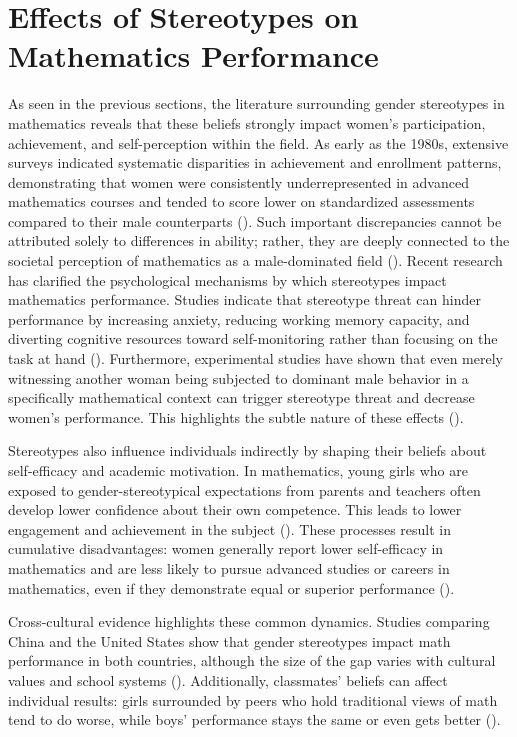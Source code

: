 \section{Effects of Stereotypes on Mathematics Performance}
As seen in the previous sections, the literature surrounding gender stereotypes in mathematics reveals that these beliefs strongly impact women's participation, achievement, and self-perception within the field. 
As early as the 1980s, extensive surveys indicated systematic disparities in achievement and enrollment patterns, demonstrating that women were consistently underrepresented in advanced mathematics courses and tended to score lower on standardized assessments compared to their male counterparts (\cite{Armstrong}).
Such important discrepancies cannot be attributed solely to differences in ability; rather, they are deeply connected to the societal perception of mathematics as a male-dominated field (\cite{FennemaTartre1985,Plante2009}).
Recent research has clarified the psychological mechanisms by which stereotypes impact mathematics performance. Studies indicate that stereotype threat can hinder performance by increasing anxiety, reducing working memory capacity, and diverting cognitive resources toward self-monitoring rather than focusing on the task at hand (\cite{Schmader2008,Spencer2016}). Furthermore, experimental studies have shown that even merely witnessing another woman being subjected to dominant male behavior in a specifically mathematical context  can trigger stereotype threat and decrease women's performance. This highlights the subtle nature of these effects (\cite{VanLooRydell2014}).

Stereotypes also influence individuals indirectly by shaping their beliefs about self-efficacy and academic motivation.  In mathematics, young girls who are exposed to gender-stereotypical expectations from parents and teachers often develop lower confidence about their own competence. This leads to lower engagement and achievement in the subject (\cite{Jacobs1991,Gunderson2012}). These processes result in cumulative disadvantages: women generally report lower self-efficacy in mathematics and are less likely to pursue advanced studies or careers in mathematics, even if they demonstrate equal or superior performance (\cite{Zel,Beat}).

Cross-cultural evidence highlights these common dynamics. Studies comparing China and the United States show that gender stereotypes impact math performance in both countries, although the size of the gap varies with cultural values and school systems (\cite{Tsui2007,LiuWilson2009}). Additionally, classmates' beliefs can affect individual results: girls surrounded by peers who hold traditional views of math tend to do worse, while boys' performance stays the same or even gets better (\cite{Smith22}).

